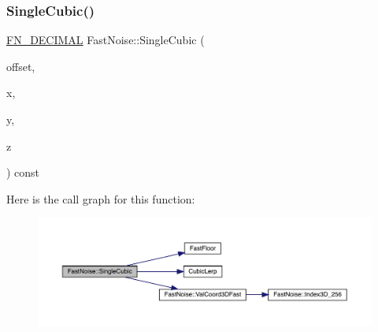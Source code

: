 \subsubsection{\texorpdfstring{Single\+Cubic()}{SingleCubic()}\hspace{0.1cm}{\footnotesize\ttfamily [2/2]}}
{\footnotesize\ttfamily \mbox{\hyperlink{_fast_noise_8h_a75a9ef6d2541c4921815b885bfd449c3}{F\+N\+\_\+\+D\+E\+C\+I\+M\+AL}} Fast\+Noise\+::\+Single\+Cubic (\begin{DoxyParamCaption}\item[{unsigned char}]{offset,  }\item[{\mbox{\hyperlink{_fast_noise_8h_a75a9ef6d2541c4921815b885bfd449c3}{F\+N\+\_\+\+D\+E\+C\+I\+M\+AL}}}]{x,  }\item[{\mbox{\hyperlink{_fast_noise_8h_a75a9ef6d2541c4921815b885bfd449c3}{F\+N\+\_\+\+D\+E\+C\+I\+M\+AL}}}]{y,  }\item[{\mbox{\hyperlink{_fast_noise_8h_a75a9ef6d2541c4921815b885bfd449c3}{F\+N\+\_\+\+D\+E\+C\+I\+M\+AL}}}]{z }\end{DoxyParamCaption}) const\hspace{0.3cm}{\ttfamily [private]}}

Here is the call graph for this function\+:
\nopagebreak
\begin{figure}[H]
\begin{center}
\leavevmode
\includegraphics[width=350pt]{d1/dd8/class_fast_noise_a916d50d82702accf7842f5376619560e_cgraph}
\end{center}
\end{figure}
\mbox{\label{class_fast_noise_a679b755d2540f9c26cb1d978f92fbef2}} 
